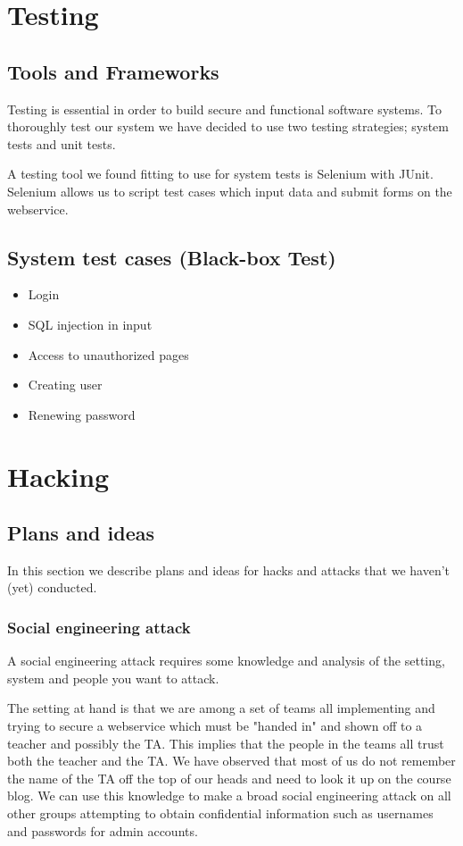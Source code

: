 \documentclass[a4paper]{article}
\begin{document}
\section{Testing}
\subsection{Tools and Frameworks}
Testing is essential in order to build secure and functional software systems. To thoroughly test our system we have decided to use two testing strategies; system tests and unit tests.

A testing tool we found fitting to use for system tests is Selenium with JUnit. Selenium allows us to script test cases which input data and submit forms on the webservice.

\subsection{System test cases (Black-box Test)}

\begin{itemize}
\item Login
\item SQL injection in input
\item Access to unauthorized pages
\item Creating user
\item Renewing password
\end{itemize}


\section{Hacking}
\subsection{Plans and ideas}
In this section we describe plans and ideas for hacks and attacks that we haven't (yet) conducted.
\subsubsection{Social engineering attack}
A social engineering attack requires some knowledge and analysis of the setting, system and people you want to attack.

The setting at hand is that we are among a set of teams all implementing and trying to secure a webservice which must be "handed in" and shown off to a teacher and possibly the TA. This implies that the people in the teams all trust both the teacher and the TA. We have observed that most of us do not remember the name of the TA off the top of our heads and need to look it up on the course blog.
We can use this knowledge to make a broad social engineering attack on all other groups attempting to obtain confidential information such as usernames and passwords for admin accounts.
\end{document}
